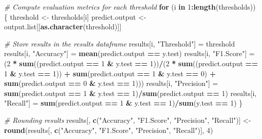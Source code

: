 \documentclass[
  10pt,
  paper=a4,
  ,captions=tableheading
]{scrartcl}
\newenvironment{Shaded}{\begin{snugshade}}{\end{snugshade}}
\newcommand{\CommentTok}[1]{\textcolor[rgb]{0.56,0.35,0.01}{\textit{#1}}}
\newcommand{\ControlFlowTok}[1]{\textcolor[rgb]{0.13,0.29,0.53}{\textbf{#1}}}
\newcommand{\DecValTok}[1]{\textcolor[rgb]{0.00,0.00,0.81}{#1}}
\newcommand{\FunctionTok}[1]{\textcolor[rgb]{0.13,0.29,0.53}{\textbf{#1}}}
\newcommand{\NormalTok}[1]{#1}
\newcommand{\OtherTok}[1]{\textcolor[rgb]{0.56,0.35,0.01}{#1}}
\newcommand{\SpecialCharTok}[1]{\textcolor[rgb]{0.81,0.36,0.00}{\textbf{#1}}}
\newcommand{\StringTok}[1]{\textcolor[rgb]{0.31,0.60,0.02}{#1}}
\begin{document}
\begin{Shaded}
\begin{Highlighting}[]
    \CommentTok{\# Compute evaluation metrics for each threshold}
    \ControlFlowTok{for}\NormalTok{ (i }\ControlFlowTok{in} \DecValTok{1}\SpecialCharTok{:}\FunctionTok{length}\NormalTok{(thresholds)) \{}
\NormalTok{        threshold }\OtherTok{\textless{}{-}}\NormalTok{ thresholds[i]}
\NormalTok{        predict.output }\OtherTok{\textless{}{-}}\NormalTok{ output.list[[}\FunctionTok{as.character}\NormalTok{(threshold)]]}

        \CommentTok{\# Store results in the results dataframe}
\NormalTok{        results[i, }\StringTok{"Threshold"}\NormalTok{] }\OtherTok{=}\NormalTok{ threshold}
\NormalTok{        results[i, }\StringTok{"Accuracy"}\NormalTok{] }\OtherTok{=} \FunctionTok{mean}\NormalTok{(predict.output }\SpecialCharTok{==}\NormalTok{ y.test)}
\NormalTok{        results[i, }\StringTok{"F1.Score"}\NormalTok{] }\OtherTok{=}\NormalTok{ (}\DecValTok{2} \SpecialCharTok{*} \FunctionTok{sum}\NormalTok{((predict.output }\SpecialCharTok{==} \DecValTok{1} \SpecialCharTok{\&}\NormalTok{ y.test }\SpecialCharTok{==}
            \DecValTok{1}\NormalTok{))}\SpecialCharTok{/}\NormalTok{(}\DecValTok{2} \SpecialCharTok{*} \FunctionTok{sum}\NormalTok{((predict.output }\SpecialCharTok{==} \DecValTok{1} \SpecialCharTok{\&}\NormalTok{ y.test }\SpecialCharTok{==} \DecValTok{1}\NormalTok{)) }\SpecialCharTok{+} \FunctionTok{sum}\NormalTok{(predict.output }\SpecialCharTok{==}
            \DecValTok{1} \SpecialCharTok{\&}\NormalTok{ y.test }\SpecialCharTok{==} \DecValTok{0}\NormalTok{) }\SpecialCharTok{+} \FunctionTok{sum}\NormalTok{(predict.output }\SpecialCharTok{==} \DecValTok{0} \SpecialCharTok{\&}\NormalTok{ y.test }\SpecialCharTok{==} \DecValTok{1}\NormalTok{)))}
\NormalTok{        results[i, }\StringTok{"Precision"}\NormalTok{] }\OtherTok{=} \FunctionTok{sum}\NormalTok{(predict.output }\SpecialCharTok{==} \DecValTok{1} \SpecialCharTok{\&}\NormalTok{ y.test }\SpecialCharTok{==} \DecValTok{1}\NormalTok{)}\SpecialCharTok{/}\FunctionTok{sum}\NormalTok{(predict.output }\SpecialCharTok{==}
            \DecValTok{1}\NormalTok{)}
\NormalTok{        results[i, }\StringTok{"Recall"}\NormalTok{] }\OtherTok{=} \FunctionTok{sum}\NormalTok{(predict.output }\SpecialCharTok{==} \DecValTok{1} \SpecialCharTok{\&}\NormalTok{ y.test }\SpecialCharTok{==} \DecValTok{1}\NormalTok{)}\SpecialCharTok{/}\FunctionTok{sum}\NormalTok{(y.test }\SpecialCharTok{==}
            \DecValTok{1}\NormalTok{)}
\NormalTok{    \}}

    \CommentTok{\# Rounding results}
\NormalTok{    results[, }\FunctionTok{c}\NormalTok{(}\StringTok{"Accuracy"}\NormalTok{, }\StringTok{"F1.Score"}\NormalTok{, }\StringTok{"Precision"}\NormalTok{, }\StringTok{"Recall"}\NormalTok{)] }\OtherTok{\textless{}{-}} \FunctionTok{round}\NormalTok{(results[,}
        \FunctionTok{c}\NormalTok{(}\StringTok{"Accuracy"}\NormalTok{, }\StringTok{"F1.Score"}\NormalTok{, }\StringTok{"Precision"}\NormalTok{, }\StringTok{"Recall"}\NormalTok{)], }\DecValTok{4}\NormalTok{)}


\end{Highlighting}
\end{Shaded}
\end{document}
